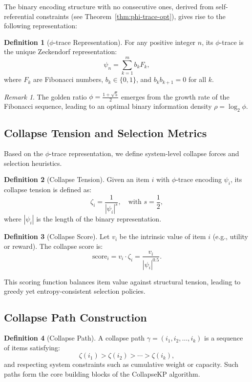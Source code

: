 \documentclass[11pt]{article}
\theoremstyle{remark}
\newtheorem{remark}{Remark}
\theoremstyle{definition}
\newtheorem{definition}{Definition}
\begin{document}
The binary encoding structure with no consecutive ones, derived from self-referential constraints (see Theorem~\ref{thm:phi-trace-opt}), gives rise to the following representation:

\begin{definition}[$\phi$-trace Representation]
For any positive integer $n$, its $\phi$-trace is the unique Zeckendorf representation:
\[
\psi_n = \sum_{k=1}^{m} b_k F_k,
\]
where $F_k$ are Fibonacci numbers, $b_k \in \{0,1\}$, and $b_k b_{k+1} = 0$ for all $k$.
\end{definition}

\begin{remark}
The golden ratio $\phi = \frac{1 + \sqrt{5}}{2}$ emerges from the growth rate of the Fibonacci sequence, leading to an optimal binary information density $\rho = \log_2 \phi$.
\end{remark}

\subsection{Collapse Tension and Selection Metrics}

Based on the $\phi$-trace representation, we define system-level collapse forces and selection heuristics.

\begin{definition}[Collapse Tension]
Given an item $i$ with $\phi$-trace encoding $\psi_i$, its collapse tension is defined as:
\[
\zeta_i = \frac{1}{|\psi_i|^{s}}, \quad \text{with } s = \frac{1}{2},
\]
where $|\psi_i|$ is the length of the binary representation.
\end{definition}

\begin{definition}[Collapse Score]
Let $v_i$ be the intrinsic value of item $i$ (e.g., utility or reward). The collapse score is:
\[
\mathrm{score}_i = v_i \cdot \zeta_i = \frac{v_i}{|\psi_i|^{0.5}}.
\]
\end{definition}

This scoring function balances item value against structural tension, leading to greedy yet entropy-consistent selection policies.

\subsection{Collapse Path Construction}

\begin{definition}[Collapse Path]
A collapse path $\gamma = (i_1, i_2, \ldots, i_k)$ is a sequence of items satisfying:
\[
\zeta(i_1) > \zeta(i_2) > \cdots > \zeta(i_k),
\]
and respecting system constraints such as cumulative weight or capacity. Such paths form the core building blocks of the CollapseKP algorithm.
\end{definition}
\end{document}
